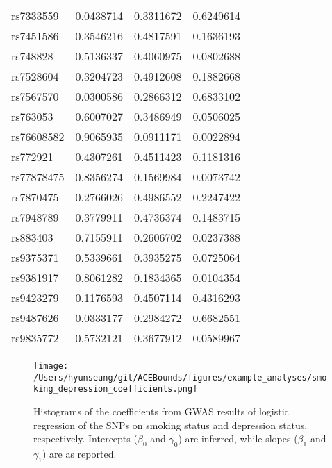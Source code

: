\documentclass[
]{article}
\theoremstyle{plain}
\begin{document}
\begin{table}[H]
\begin{minipage}{0.5\linewidth}
\begin{table}[H]
\begin{tabular}{lrrr}
\addlinespace
rs7333559 & 0.0438714 & 0.3311672 & 0.6249614\\
rs7451586 & 0.3546216 & 0.4817591 & 0.1636193\\
rs748828 & 0.5136337 & 0.4060975 & 0.0802688\\
rs7528604 & 0.3204723 & 0.4912608 & 0.1882668\\
rs7567570 & 0.0300586 & 0.2866312 & 0.6833102\\
\addlinespace
rs763053 & 0.6007027 & 0.3486949 & 0.0506025\\
rs76608582 & 0.9065935 & 0.0911171 & 0.0022894\\
rs772921 & 0.4307261 & 0.4511423 & 0.1181316\\
rs77878475 & 0.8356274 & 0.1569984 & 0.0073742\\
rs7870475 & 0.2766026 & 0.4986552 & 0.2247422\\
\addlinespace
rs7948789 & 0.3779911 & 0.4736374 & 0.1483715\\
rs883403 & 0.7155911 & 0.2606702 & 0.0237388\\
rs9375371 & 0.5339661 & 0.3935275 & 0.0725064\\
rs9381917 & 0.8061282 & 0.1834365 & 0.0104354\\
rs9423279 & 0.1176593 & 0.4507114 & 0.4316293\\
\addlinespace
rs9487626 & 0.0333177 & 0.2984272 & 0.6682551\\
rs9835772 & 0.5732121 & 0.3677912 & 0.0589967\\
\bottomrule
\end{tabular}
\end{table}


  \end{minipage}
\end{table}

\begin{figure}[H]
  \center
  \texttt{[image: /Users/hyunseung/git/ACEBounds/figures/example\_analyses/smoking\_depression\_coefficients.png]}
  \caption{Histograms of the coefficients from GWAS results of logistic regression of the SNPs on smoking status and depression status, respectively. Intercepts ($\beta_0$ and $\gamma_0$) are inferred, while slopes ($\beta_1$ and $\gamma_1$) are as reported.}
  \label{fig:marginal-distribution-of-coefficients-depression}
\end{figure}
\end{document}
